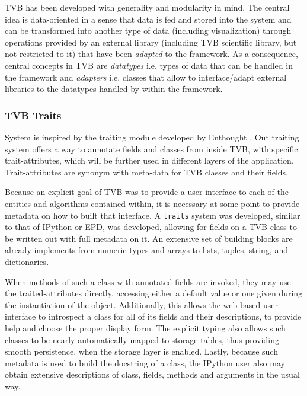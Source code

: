 TVB has been developed with generality and modularity in mind. The central idea is data-oriented in a sense that
data is fed and stored into the system and can be transformed into another type
of data (including visualization) through operations provided by an external
library (including TVB scientific library, but not restricted to it) that have
been \emph{adapted} to the framework. As a consequence, central concepts in TVB
are \emph{datatypes} i.e. types of data that can be handled in the framework and
\emph{adapters} i.e. classes that allow to interface/adapt external libraries
to  the datatypes handled by within the framework.

	\subsubsection{TVB Traits}

System is inspired by the traiting module developed by Enthought \cite{Enthought_2001}.
Out traiting system offers a way to annotate fields and classes from inside TVB, with specific trait-attributes,
which will be further used in different layers of the application.
Trait-attributes are synonym with meta-data for TVB classes and their fields.

Because an explicit goal of TVB was to provide a user interface to each of the
entities and algorithms contained within, it is necessary at some point to
provide metadata on how to built that interface. A \texttt{traits} system was developed, similar to that of
IPython or EPD, was developed, allowing for fields on a TVB class to
be written out with full metadata on it. An extensive set of  building 
blocks are already implements from numeric types and arrays to lists, tuples, 
string, and dictionaries.

 When methods of such a class with annotated fields are invoked,
they may use the traited-attributes directly, accessing either a default value
or one given during the instantiation of the object. Additionally, this allows
the web-based user interface to introspect a class for all of its fields and their
descriptions, to provide help and choose the proper display form. The explicit typing also allows
such classes to be nearly automatically mapped to storage tables,
thus providing smooth persistence, when the storage layer is enabled.  
Lastly, because such metadata is used to build the docstring of a class,
the IPython user also may obtain extensive descriptions of class, fields, methods and
arguments in the usual way. 

